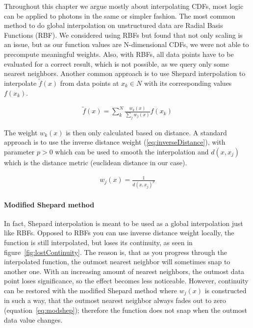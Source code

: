 Throughout this chapter we argue mostly about interpolating CDFs, most logic can be applied to photons in the same or simpler fashion. The most common method to do global interpolation on unstructured data are Radial Basis Functions (RBF). We considered using RBFs but found that not only scaling is an issue, but as our function values are N-dimensional CDFs, we were not able to precompute meaningful weights. Also, with RBFs, all data points have to be evaluated for a correct result, which is not possible, as we query only some nearest neighbors. Another common approach is to use Shepard interpolation to interpolate $\widetilde{f}(x)$ from data points at $x_k \in N$ with its corresponding values $f(x_k)$. 

\begin{align}\label{eq:shepard}
\widetilde{f}(x) = \sum_{k}^{N}\frac{w_k(x)}{\sum\nolimits_{j}w_j(x)}f(x_k)
\end{align}

The weight $w_k(x)$ is then only calculated based on distance. A standard approach is to use the inverse distance weight (\ref{eq:inverseDistance}), with parameter $p > 0$ which can be used to smooth the interpolation and $d(x, x_j)$ which is the distance metric (euclidean distance in our case).

\begin{align}\label{eq:inverseDistance}
w_j(x) = \frac{1}{d(x, x_j)^p}
\end{align}

\paragraph{Modified Shepard method}

In fact, Shepard interpolation is meant to be used as a global interpolation just like RBFs. Opposed to RBFs you can use inverse distance weight locally, the function is still interpolated, but loses its continuity, as seen in figure~\ref{fig:lostContinuity}. The reason is, that as you progress through the interpolated function, the outmost nearest neighbor will sometimes snap to another one. With an increasing amount of nearest neighbors, the outmost data point loses significance, so the effect becomes less noticeable. However, continuity can be restored with the modified Shepard method  where $w_j(x)$ is constructed in such a way, that the outmost nearest neighbor always fades out to zero (equation~\ref{eq:modshep}); therefore the function does not snap when the outmost data value changes.

